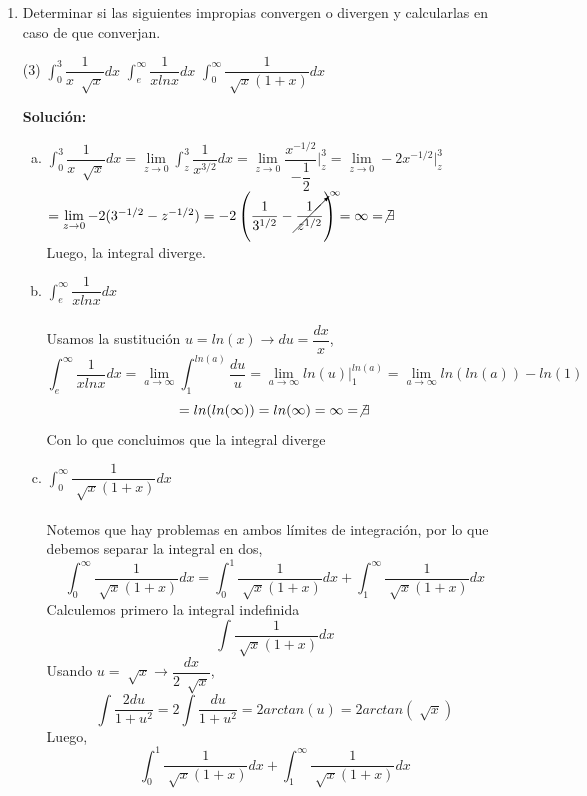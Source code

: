 \documentclass[12pt]{article}
\newenvironment{solucion}
{\begin{mdframed}[backgroundcolor=black!10]
		{\bf Solución:}\\
	}
	{
	\end{mdframed}
}
\newenvironment{preguntas}
{\begin{enumerate}\itemsep12pt
	}
	{
	\end{enumerate}
}
\newcommand{\ev}{\Big|}
\newcommand{\ra}{\rightarrow}
\begin{document}
\begin{preguntas}
\item Determinar si las siguientes impropias convergen o divergen y calcularlas en caso de que converjan.
\begin{tasks}(3)
\task $\displaystyle\int_{0}^{3}\dfrac{1}{x\ \sqrt[]{x}}dx$
\task $\displaystyle\int_{e}^{\infty}\dfrac{1}{xlnx}dx$
\task $\displaystyle\int_{0}^{\infty}\dfrac{1}{\sqrt[]{x}(1+x)}dx$
\end{tasks}
\begin{solucion}

\begin{enumerate}[a)]
\item $\displaystyle\int_{0}^{3}\dfrac{1}{x\ \sqrt[]{x}}dx
			= \lim\limits_{z\ra 0} \displaystyle\int_{z}^{3}\dfrac{1}{x^{3/2}}dx 
			= \lim\limits_{z\ra 0} \dfrac{x^{-1/2}}{-\dfrac{1}{2}}\ev_z^3 
			= \lim\limits_{z\ra 0} -2x^{-1/2} \ev_z^3$\\
			$= \lim\limits_{z\ra 0} -2(3^{-1/2}-z^{-1/2})
			 = -2\left(\dfrac{1}{3^{1/2}} - \cancelto{\infty}{\dfrac{1}{z^{1/2}}}\right) = \infty = \not \exists$\\
			Luego, la integral diverge.
\item $\displaystyle\int_{e}^{\infty}\dfrac{1}{xlnx}dx$\\
			\\
			Usamos la sustitución $u=ln(x) \ra du = \dfrac{dx}{x}$,
			$$\displaystyle\int_{e}^{\infty}\dfrac{1}{xlnx}dx
			= \lim\limits_{a\ra \infty} \int_1^{ln(a)} \dfrac{du}{u}
			= \lim\limits_{a\ra \infty} ln(u) \ev_1^{ln(a)}
			= \lim\limits_{a\ra \infty} ln(ln(a)) - ln(1)$$
			$$= ln(ln(\infty)) = ln(\infty) = \infty = \not \exists$$
			Con lo que concluimos que la integral diverge
\item $\displaystyle\int_{0}^{\infty}\dfrac{1}{\sqrt[]{x}(1+x)}dx$\\
			\\
			Notemos que hay problemas en ambos límites de integración, por lo que debemos separar la integral en dos,
			$$\displaystyle\int_{0}^{\infty}\dfrac{1}{\sqrt[]{x}(1+x)}dx = \displaystyle\int_{0}^{1}\dfrac{1}{\sqrt[]{x}(1+x)}dx + \displaystyle\int_{1}^{\infty}\dfrac{1}{\sqrt[]{x}(1+x)}dx$$
			Calculemos primero la integral indefinida
			$$\displaystyle\int \dfrac{1}{\sqrt[]{x}(1+x)}dx$$
			Usando $u = \sqrt[]{x} \ra \dfrac{dx}{2\ \sqrt[]{x}}$,
			$$\int \dfrac{2du}{1+u^2} = 2\int \dfrac{du}{1+u^2} = 2arctan(u) = 2arctan(\sqrt[]{x})$$
			Luego,
			$$\displaystyle\int_{0}^{1}\dfrac{1}{\sqrt[]{x}(1+x)}dx + \displaystyle\int_{1}^{\infty}\dfrac{1}{\sqrt[]{x}(1+x)}dx$$

\end{enumerate}
\end{solucion}
\end{preguntas}
\end{document}
